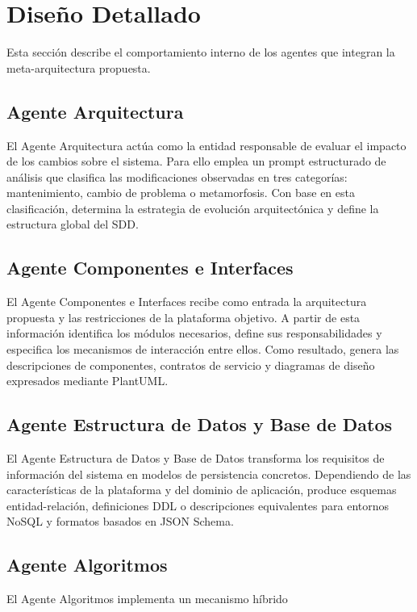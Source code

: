 \documentclass[12pt, letterpaper, oneside]{book}
\begin{document}
\section{Diseño Detallado} Esta sección describe el comportamiento interno de los agentes que integran la meta-arquitectura propuesta. \subsection{Agente Arquitectura} El Agente Arquitectura actúa como la entidad responsable de evaluar el impacto de los cambios sobre el sistema. Para ello emplea un prompt estructurado de análisis que clasifica las modificaciones observadas en tres categorías: mantenimiento, cambio de problema o metamorfosis. Con base en esta clasificación, determina la estrategia de evolución arquitectónica y define la estructura global del SDD. \subsection{Agente Componentes e Interfaces} El Agente Componentes e Interfaces recibe como entrada la arquitectura propuesta y las restricciones de la plataforma objetivo. A partir de esta información identifica los módulos necesarios, define sus responsabilidades y especifica los mecanismos de interacción entre ellos. Como resultado, genera las descripciones de componentes, contratos de servicio y diagramas de diseño expresados mediante PlantUML. \subsection{Agente Estructura de Datos y Base de Datos} El Agente Estructura de Datos y Base de Datos transforma los requisitos de información del sistema en modelos de persistencia concretos. Dependiendo de las características de la plataforma y del dominio de aplicación, produce esquemas entidad-relación, definiciones DDL o descripciones equivalentes para entornos NoSQL y formatos basados en JSON Schema. \subsection{Agente Algoritmos} El Agente Algoritmos implementa un mecanismo híbrido 
\end{document}
